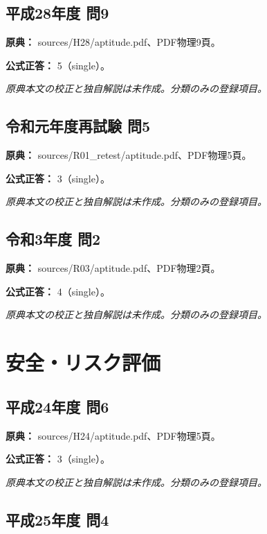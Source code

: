 \subsection{平成28年度 問9}
\label{q:h28-reg-apt-09}

\noindent\textbf{原典：} sources/H28/aptitude.pdf、PDF物理9頁。

\textbf{公式正答：} 5（single）。

\par\textit{原典本文の校正と独自解説は未作成。分類のみの登録項目。}

\subsection{令和元年度再試験 問5}
\label{q:r01-ret-apt-05}

\noindent\textbf{原典：} sources/R01\_retest/aptitude.pdf、PDF物理5頁。

\textbf{公式正答：} 3（single）。

\par\textit{原典本文の校正と独自解説は未作成。分類のみの登録項目。}

\subsection{令和3年度 問2}
\label{q:r03-reg-apt-02}

\noindent\textbf{原典：} sources/R03/aptitude.pdf、PDF物理2頁。

\textbf{公式正答：} 4（single）。

\par\textit{原典本文の校正と独自解説は未作成。分類のみの登録項目。}

\section{安全・リスク評価}

\subsection{平成24年度 問6}
\label{q:h24-reg-apt-06}

\noindent\textbf{原典：} sources/H24/aptitude.pdf、PDF物理5頁。

\textbf{公式正答：} 3（single）。

\par\textit{原典本文の校正と独自解説は未作成。分類のみの登録項目。}

\subsection{平成25年度 問4}
\label{q:h25-reg-apt-04}

